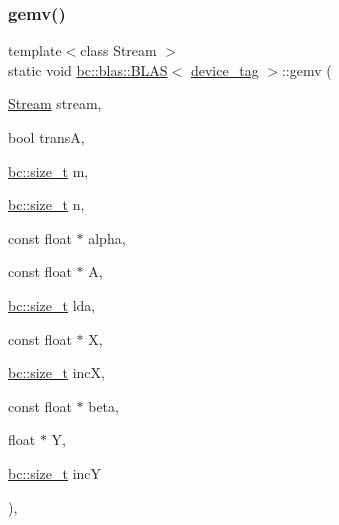\subsubsection{\texorpdfstring{gemv()}{gemv()}}
{\footnotesize\ttfamily template$<$class Stream $>$ \\
static void \hyperlink{structbc_1_1blas_1_1BLAS}{bc\+::blas\+::\+B\+L\+AS}$<$ \hyperlink{structbc_1_1device__tag}{device\+\_\+tag} $>$\+::gemv (\begin{DoxyParamCaption}\item[{\hyperlink{classbc_1_1streams_1_1Stream}{Stream}}]{stream,  }\item[{bool}]{transA,  }\item[{\hyperlink{namespacebc_aaf8e3fbf99b04b1b57c4f80c6f55d3c5}{bc\+::size\+\_\+t}}]{m,  }\item[{\hyperlink{namespacebc_aaf8e3fbf99b04b1b57c4f80c6f55d3c5}{bc\+::size\+\_\+t}}]{n,  }\item[{const float $\ast$}]{alpha,  }\item[{const float $\ast$}]{A,  }\item[{\hyperlink{namespacebc_aaf8e3fbf99b04b1b57c4f80c6f55d3c5}{bc\+::size\+\_\+t}}]{lda,  }\item[{const float $\ast$}]{X,  }\item[{\hyperlink{namespacebc_aaf8e3fbf99b04b1b57c4f80c6f55d3c5}{bc\+::size\+\_\+t}}]{incX,  }\item[{const float $\ast$}]{beta,  }\item[{float $\ast$}]{Y,  }\item[{\hyperlink{namespacebc_aaf8e3fbf99b04b1b57c4f80c6f55d3c5}{bc\+::size\+\_\+t}}]{incY }\end{DoxyParamCaption})\hspace{0.3cm}{\ttfamily [inline]}, {\ttfamily [static]}}

\mbox{\label{structbc_1_1blas_1_1BLAS_3_01device__tag_01_4_aebaf3d1509c53d5eff0d9670cd0de23d}} 
